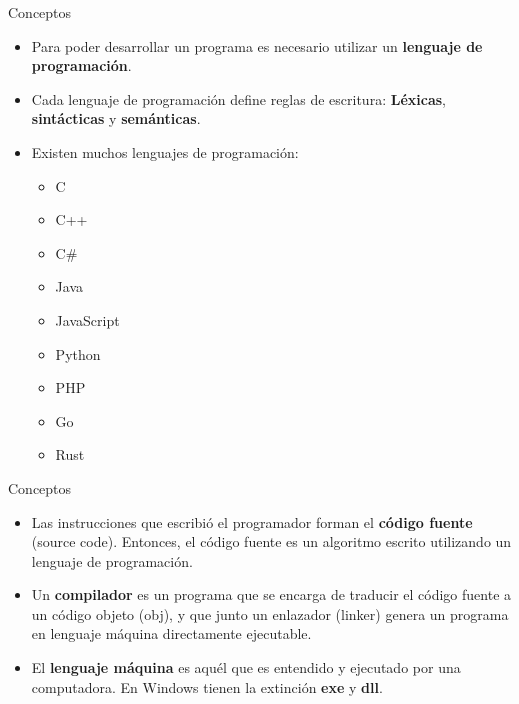 \begin{frame}[c]{Conceptos}
  \begin{itemize}
    \item Para poder desarrollar un programa es necesario utilizar un
      \textbf{lenguaje de programación}.
    \pausa
    \item Cada lenguaje de programación define reglas de escritura:
      \textbf{Léxicas}, \textbf{sintácticas} y \textbf{semánticas}.
    \pausa
    \item Existen muchos lenguajes de programación:
      \begin{multicols}{3}
        \begin{itemize}
          \item C
          \pausa
          \item C++
          \pausa
          \item C\#
          \pausa
          \item Java
          \pausa
          \item JavaScript
          \pausa
          \item Python
          \pausa
          \item PHP
          \pausa
          \item Go
          \pausa
          \item Rust
        \end{itemize}
      \end{multicols}
  \end{itemize}
\end{frame}

\begin{frame}[c]{Conceptos}
  \begin{itemize}
    \item Las instrucciones que escribió el programador forman el
      \textbf{código fuente} (source code). Entonces, el código fuente es un
      algoritmo escrito utilizando un lenguaje de programación.
    \pausa
    \item Un \textbf{compilador} es un programa que se encarga de traducir
      el código fuente a un código objeto (obj), y que junto un enlazador
      (linker) genera un programa en lenguaje máquina directamente ejecutable.
    \pausa
    \item El \textbf{lenguaje máquina} es aquél que es entendido y ejecutado
      por una computadora. En Windows tienen la extinción \textbf{exe} y
      \textbf{dll}.
  \end{itemize}
\end{frame}

